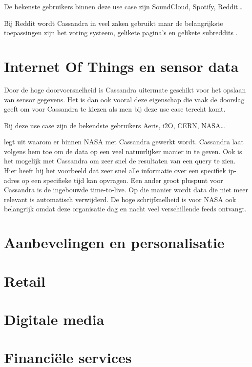 De bekenste gebruikers binnen deze use case zijn SoundCloud, Spotify, Reddit\dots

Bij Reddit wordt Cassandra in veel zaken gebruikt maar de belangrijkste toepassingen zijn  het voting systeem, gelikete pagina's en gelikete subreddits \citep{Harvey2013Reddit}.

\section{Internet Of Things en sensor data}
Door de hoge doorvoersnelheid is Cassandra uitermate geschikt voor het opslaan van sensor gegevens.
Het is dan ook vooral deze eigenschap die vaak de doorslag geeft om voor Cassandra te kiezen als men bij deze use case terecht komt.

Bij deze use case zijn de bekendste gebruikers Aeris, i2O, CERN, NASA\dots

\cite{Keller2013Nasa} legt uit waarom er binnen NASA met Cassandra gewerkt wordt.
Cassandra laat volgens hem toe om de data op een veel natuurlijker manier in te geven.
Ook is het mogelijk met Cassandra om zeer snel de resultaten van een query te zien.
Hier heeft hij het voorbeeld dat zeer snel alle informatie over een specifiek ip-adres op een specifieke tijd kan opvragen.
Een ander groot pluspunt voor Cassandra is de ingebouwde time-to-live.
Op die manier wordt data die niet meer relevant is automatisch verwijderd.
De hoge schrijfsnelheid is voor NASA ook belangrijk omdat deze organisatie dag en nacht veel verschillende feeds ontvangt.

\section{Aanbevelingen en personalisatie}

\section{Retail}

\section{Digitale media}

\section{Financiële services}
